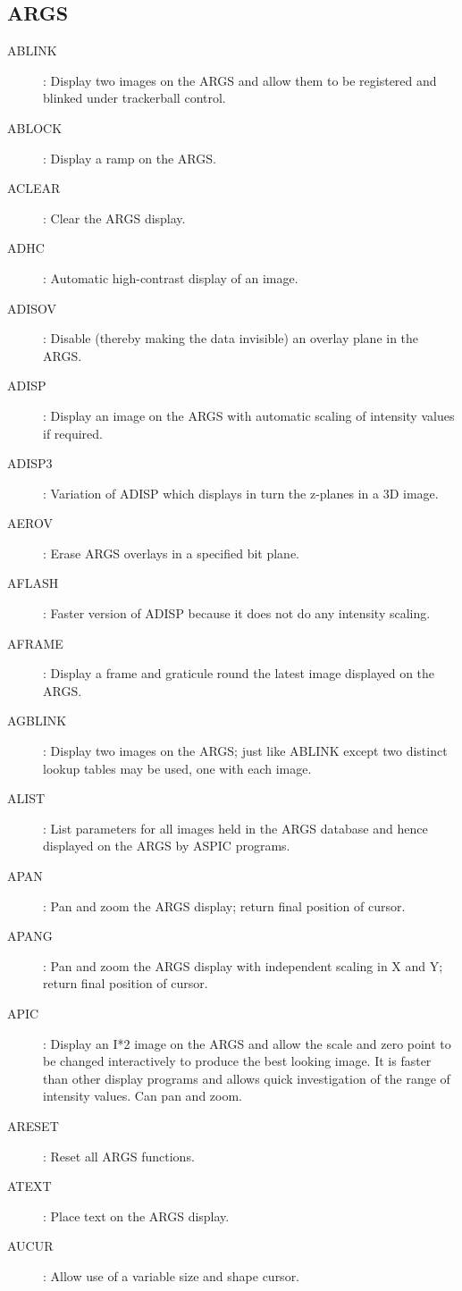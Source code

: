 \subsection {ARGS}
\begin{description}
\item [ABLINK]: Display two images on the ARGS and allow them to be registered
and blinked under trackerball control.
\item [ABLOCK]: Display a ramp on the ARGS.
\item [ACLEAR]: Clear the ARGS display.
\item [ADHC]: Automatic high-contrast display of an image.
\item [ADISOV]: Disable (thereby making the data invisible) an overlay plane in
the ARGS.
\item [ADISP]: Display an image on the ARGS with automatic scaling of intensity
values if required.
\item [ADISP3]: Variation of ADISP which displays in turn the z-planes in a
3D image.
\item [AEROV]: Erase ARGS overlays in a specified bit plane.
\item [AFLASH]: Faster version of ADISP because it does not do any intensity
scaling.
\item [AFRAME]: Display a frame and graticule round the latest image displayed
on the ARGS.
\item [AGBLINK]: Display two images on the ARGS; just like ABLINK except two
distinct lookup tables may be used, one with each image.
\item [ALIST]: List parameters for all images held in the ARGS database and
hence displayed on the ARGS by ASPIC programs.
\item [APAN]: Pan and zoom the ARGS display; return final position of cursor.
\item [APANG]: Pan and zoom the ARGS display with independent scaling in X and
Y; return final position of cursor.
\item [APIC]: Display an I*2 image on the ARGS and allow the scale and zero
point to be changed interactively to produce the best looking image.
It is faster than other display programs and allows quick investigation of the
range of intensity values.
Can pan and zoom.
\item [ARESET]: Reset all ARGS functions.
\item [ATEXT]: Place text on the ARGS display.
\item [AUCUR]: Allow use of a variable size and shape cursor.

\end{description}
